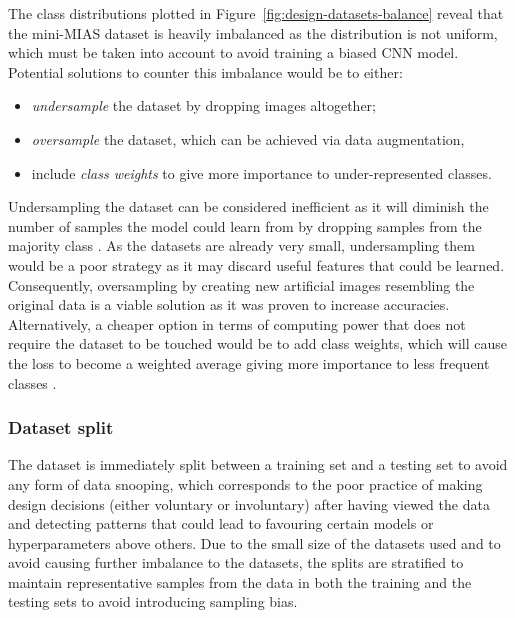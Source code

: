The class distributions plotted in Figure~\ref{fig:design-datasets-balance} reveal that the mini-MIAS dataset is heavily imbalanced as the distribution is not uniform, which must be taken into account to avoid training a biased CNN model. Potential solutions to counter this imbalance would be to either:
\begin{itemize}
    \item \textit{undersample} the dataset by dropping images altogether;
    \item \textit{oversample} the dataset, which can be achieved via data augmentation,
    \item include \textit{class weights} to give more importance to under-represented classes. 
\end{itemize}

Undersampling the dataset can be considered inefficient as it will diminish the number of samples the model could learn from by dropping samples from the majority class \citep{Liu2009}. As the datasets are already very small, undersampling them would be a poor strategy as it may discard useful features that could be learned. Consequently, oversampling by creating new artificial images resembling the original data is a viable solution as it was proven to increase accuracies. Alternatively, a cheaper option in terms of computing power that does not require the dataset to be touched would be to add class weights, which will cause the loss to become a weighted average giving more importance to less frequent classes \citep{Zhu2018}.

\subsubsection{Dataset split}

The dataset is immediately split between a training set and a testing set to avoid any form of data snooping, which corresponds to the poor practice of making design decisions (either voluntary or involuntary) after having viewed the data and detecting patterns that could lead to favouring certain models or hyperparameters above others. Due to the small size of the datasets used and to avoid causing further imbalance to the datasets, the splits are stratified to maintain representative samples from the data in both the training and the testing sets to avoid introducing sampling bias.\\

